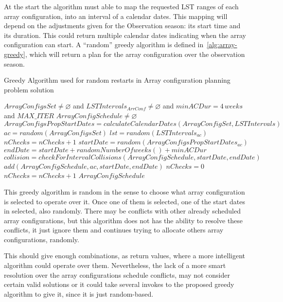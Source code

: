 At the start the algorithm must able to map the requested LST ranges of each array configuration, into an interval of a calendar dates. This mapping will depend on the adjustments given for the Observation season: its start time and its duration. This could return multiple calendar dates indicating when the array configuration can start. A ``random'' greedy algorithm is defined in~\ref{alg:array-greedy}, which will return a plan for the array configuration over the observation season.
\begin{algorithm}[h!]
\caption{Greedy Algorithm used for random restarts in Array configuration planning problem solution}          
\label{alg:array-greedy}                   
\begin{algorithmic}                    
    \REQUIRE $ArrayConfigsSet \neq \varnothing $ and $LSTIntervals_{ArrConf} \neq \varnothing$ and $minACDur = 4\,weeks$  and $MAX\_ITER$
    \ENSURE $ArrayConfigSchedule \neq \varnothing$
    \STATE $ArrayConfigsPropStartDates = calculateCalendarDates(ArrayConfigSet, LSTIntervals)$
    \REPEAT 
    \STATE $ac = random(ArrayConfigsSet)$
    \STATE $lst = random(LSTIntervals_{ac})$
    \STATE $nChecks = nChecks + 1$
    \ELSE
    \STATE $startDate = random(ArrayConfigsPropStartDates_{ac})$
    \STATE $endDate = startDate + randomNumberOfweeks() + minACDur$
    \STATE $collision = checkForIntervalCollisions(ArrayConfigSchedule, startDate, endDate)$
    \STATE $add(ArrayConfigSchedule, ac, startDate, endDate)$
    \STATE $nChecks = 0$
    \ELSE
    \STATE $nChecks = nChecks + 1$
    \ENDIF
    \ENDIF
    \RETURN $ArrayConfigSchedule$
    \end{algorithmic}
\end{algorithm}

This greedy algorithm is random in the sense to choose what array configuration is selected to operate over it. Once one of them is selected, one of the start dates in selected, also randomly. There may be conflicts with other already scheduled array configurations, but this algorithm does not has the ability to resolve these conflicts, it just ignore them and continues trying to allocate others array configurations, randomly.

This should give enough combinations, as return values, where a more intelligent algorithm could operate over them. Nevertheless, the lack of a more smart resolution over the array configurations schedule conflicts, may not consider certain valid solutions or it could take several invokes to the proposed greedy algorithm to give it, since it is just random-based. 


